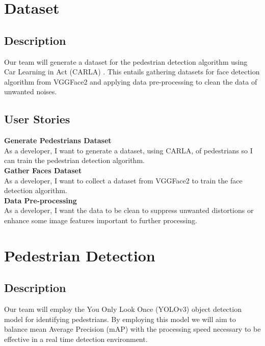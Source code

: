 \documentclass[onecolumn, draftclsnofoot,10pt, compsoc]{IEEEtran}
\begin{document}
\section{Dataset}

\subsection{Description}
Our team will generate a dataset for the pedestrian detection algorithm using Car Learning in Act (CARLA) \cite{Carla}. This entails gathering datasets for face detection algorithm from VGGFace2 \cite{VGGFace2} and applying data pre-processing to clean the data of unwanted noises.

\subsection{User Stories}
\textbf{Generate Pedestrians Dataset} \\
As a developer, I want to generate a dataset, using CARLA, of pedestrians so I can train the pedestrian detection algorithm.
\\
\textbf{Gather Faces Dataset} \\
As a developer, I want to collect a dataset from VGGFace2 to train the face detection algorithm.
\\
\textbf{Data Pre-processing} \\
As a developer, I want the data to be clean to suppress unwanted distortions or enhance some image features important to further processing.


\section{Pedestrian Detection}
\subsection{Description}
Our team will employ the You Only Look Once (YOLOv3) \cite{YOLOv3} object detection model for identifying pedestrians. By employing this model we will aim to balance mean Average Precision (mAP) with the processing speed necessary to be effective in a real time detection environment.
\end{document}

